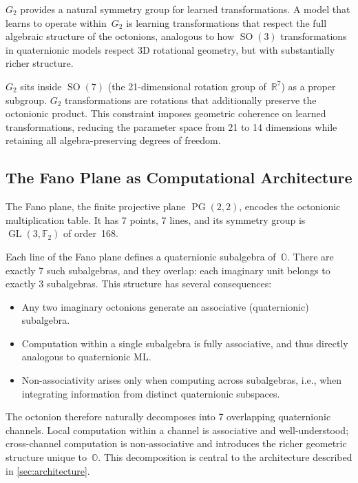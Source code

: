 \documentclass[11pt,a4paper]{article}
\DeclareMathOperator{\SO}{SO}
\DeclareMathOperator{\GL}{GL}
\DeclareMathOperator{\PG}{PG}
\newcommand{\Oct}{\mathbb{O}}
\newcommand{\Real}{\mathbb{R}}
\begin{document}
$G_2$ provides a natural symmetry group for learned transformations. A model that learns to operate within~$G_2$ is learning transformations that respect the full algebraic structure of the octonions, analogous to how $\SO(3)$ transformations in quaternionic models respect 3D rotational geometry, but with substantially richer structure.

$G_2$ sits inside $\SO(7)$ (the 21-dimensional rotation group of~$\Real^7$) as a proper subgroup. $G_2$ transformations are rotations that additionally preserve the octonionic product. This constraint imposes geometric coherence on learned transformations, reducing the parameter space from 21 to 14 dimensions while retaining all algebra-preserving degrees of freedom.

\subsection{The Fano Plane as Computational Architecture}
\label{sec:fano}

The Fano plane, the finite projective plane $\PG(2,2)$, encodes the octonionic multiplication table. It has 7 points, 7 lines, and its symmetry group is $\GL(3, \mathbb{F}_2)$ of order~168.

Each line of the Fano plane defines a quaternionic subalgebra of~$\Oct$. There are exactly 7 such subalgebras, and they overlap: each imaginary unit belongs to exactly 3 subalgebras. This structure has several consequences:
\begin{itemize}[nosep]
  \item Any two imaginary octonions generate an associative (quaternionic) subalgebra.
  \item Computation within a single subalgebra is fully associative, and thus directly analogous to quaternionic ML.
  \item Non-associativity arises only when computing across subalgebras, i.e., when integrating information from distinct quaternionic subspaces.
\end{itemize}

The octonion therefore naturally decomposes into 7 overlapping quaternionic channels. Local computation within a channel is associative and well-understood; cross-channel computation is non-associative and introduces the richer geometric structure unique to~$\Oct$. This decomposition is central to the architecture described in \cref{sec:architecture}.

\end{document}
